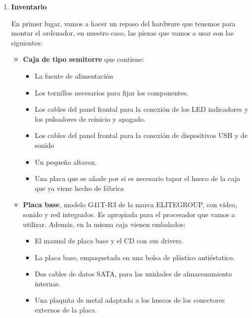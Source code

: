 \begin{enumerate}
    \item \textbf{Inventario}

    En primer lugar, vamos a hacer un repaso del hardware que tenemos para montar el ordenador, en nuestro caso, las piezas que vamos a usar son las siguientes:

    \begin{itemize}
        \item \textbf{Caja de tipo semitorre} que contiene:
        \begin{itemize}
            \item La fuente de alimentación
            \item Los tornillos necesarios para fijar los componentes.
            \item Los cables del panel frontal para la conexión de los LED indicadores y los pulsadores de reinicio y apagado.
            \item Los cables del panel frontal para la conexión de dispositivos USB y de sonido
            \item Un pequeño altavoz.
            \item Una placa que se añade por si es necesario tapar el hueco de la caja que ya viene hecho de fábrica
        \end{itemize}

        \item \textbf{Placa base}, modelo G41T-R3 de la marca ELITEGROUP, con vídeo, sonido y red integrados. Es apropiada para el procesador que vamos a utilizar. Además, en la misma caja vienen embalados:

        \begin{itemize}
            \item El manual de placa base y el CD con sus drivers.
            \item La placa base, empaquetada en una bolsa de plástico antiéstatico.
            \item Dos cables de datos SATA, para las unidades de almacenamiento internas.
            \item Una plaquita de metal adaptada a los huecos de los conectores externos de la placa.
        \end{itemize}


\end{itemize}
\end{enumerate}
